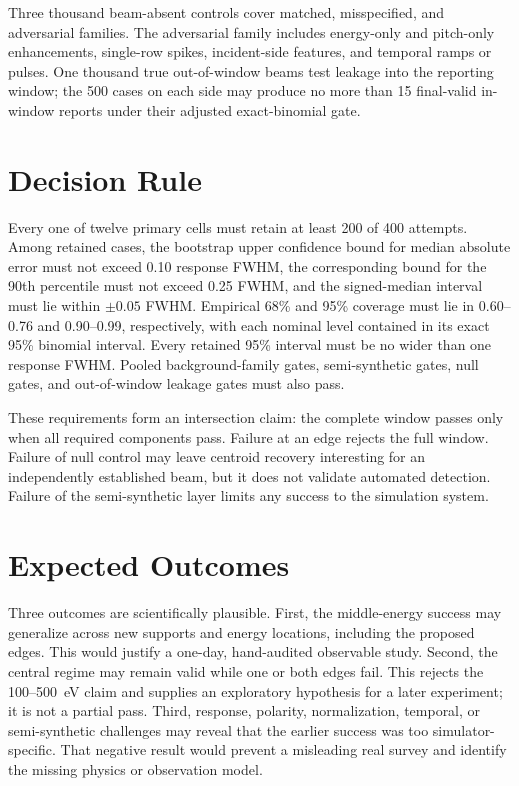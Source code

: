 \documentclass[11pt]{article}
\begin{document}
Three thousand beam-absent controls cover matched, misspecified, and adversarial
families.  The adversarial family includes energy-only and pitch-only
enhancements, single-row spikes, incident-side features, and temporal ramps or
pulses.  One thousand true out-of-window beams test leakage into the reporting
window; the 500 cases on each side may produce no more than 15 final-valid
in-window reports under their adjusted exact-binomial gate.

\section{Decision Rule}

Every one of twelve primary cells must retain at least 200 of 400 attempts.
Among retained cases, the bootstrap upper confidence bound for median absolute
error must not exceed 0.10 response FWHM, the corresponding bound for the 90th
percentile must not exceed 0.25 FWHM, and the signed-median interval must lie
within $\pm0.05$ FWHM.  Empirical 68\% and 95\% coverage must lie in
0.60--0.76 and 0.90--0.99, respectively, with each nominal level contained in
its exact 95\% binomial interval.  Every retained 95\% interval must be no wider
than one response FWHM.  Pooled background-family gates, semi-synthetic gates,
null gates, and out-of-window leakage gates must also pass.

These requirements form an intersection claim: the complete window passes only
when all required components pass.  Failure at an edge rejects the full window.
Failure of null control may leave centroid recovery interesting for an
independently established beam, but it does not validate automated detection.
Failure of the semi-synthetic layer limits any success to the simulation system.

\section{Expected Outcomes}

Three outcomes are scientifically plausible.  First, the middle-energy success
may generalize across new supports and energy locations, including the proposed
edges.  This would justify a one-day, hand-audited observable study.  Second,
the central regime may remain valid while one or both edges fail.  This rejects
the 100--500~eV claim and supplies an exploratory hypothesis for a later
experiment; it is not a partial pass.  Third, response, polarity, normalization,
temporal, or semi-synthetic challenges may reveal that the earlier success was
too simulator-specific.  That negative result would prevent a misleading real
survey and identify the missing physics or observation model.
\end{document}
